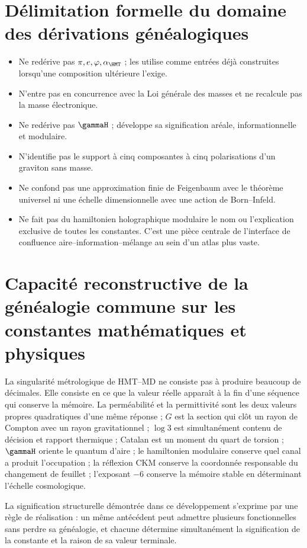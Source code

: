 \section{Délimitation formelle du domaine des dérivations généalogiques}

\begin{itemize}
\item Ne redérive pas \(\pi,e,\varphi,\alpha_{\HMT}\) ; les utilise comme entrées déjà
construites lorsqu'une composition ultérieure l'exige.
\item N'entre pas en concurrence avec la Loi générale des masses et ne recalcule pas la masse électronique.
\item Ne redérive pas \(\gammaH\) ; développe sa signification aréale,
informationnelle et modulaire.
\item N'identifie pas le support à cinq composantes à cinq polarisations
d'un graviton sans masse.
\item Ne confond pas une approximation finie de Feigenbaum avec le théorème
universel ni une échelle dimensionnelle avec une action de Born--Infeld.
\item Ne fait pas du hamiltonien holographique modulaire le nom ou
l'explication exclusive de toutes les constantes. C'est une pièce centrale de
l'interface de confluence aire--information--mélange au sein d'un atlas plus vaste.
\end{itemize}

\section{Capacité reconstructive de la généalogie commune sur les constantes mathématiques et physiques}

La singularité métrologique de HMT--MD ne consiste pas à produire beaucoup de
décimales. Elle consiste en ce que la valeur réelle apparaît à la fin d'une séquence qui
conserve la mémoire. La perméabilité et la permittivité sont les deux valeurs propres
quadratiques d'une même réponse ; \(G\) est la section qui clôt un rayon
de Compton avec un rayon gravitationnel ; \(\log3\) est simultanément contenu de
décision et rapport thermique ; Catalan est un moment du quart de torsion ;
\(\gammaH\) oriente le quantum d'aire ; le hamiltonien modulaire conserve quel
canal a produit l'occupation ; la réflexion CKM conserve la coordonnée
responsable du changement de feuillet ;
l'exposant \(-6\) conserve la mémoire stable en déterminant l'échelle
cosmologique.

\begin{proposition}
La signification structurelle démontrée dans ce développement s'exprime
par une règle de réalisation : un même antécédent peut admettre
plusieurs fonctionnelles sans perdre sa généalogie, et chacune détermine
simultanément la signification de la constante et la raison de sa valeur
terminale.
\end{proposition}

